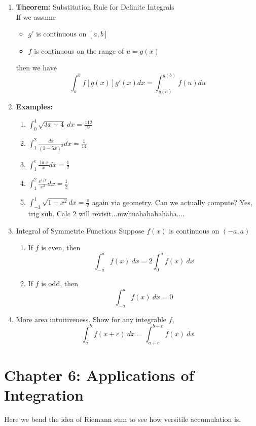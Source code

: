 \documentclass{article}
\newcommand{\ds}{\displaystyle}
\begin{document}
\begin{enumerate}
\item {\bf Theorem:} Substitution Rule for Definite Integrals \\
If we assume
\begin{itemize}
\item $g'$ is continuous on $[a,b]$
\item $f$ is continuous on the range of $u=g(x)$
\end{itemize}
then we have
$$
\int_a^b f[g(x)]g'(x)dx = \int_{g(a)}^{g(b)}f(u)du
$$

\item {\bf Examples:}
\begin{enumerate}
\item $\ds \int_0^4 \sqrt{3x+4}~dx  = \frac{112}{9}$
\item $\ds \int_1^2\frac{dx}{(3-5x)^2}dx = \frac{1}{14}$
\item $\ds \int_1^e \frac{\ln x}{x}dx = \frac{1}{2}$
\item $\ds \int_1^2 \frac{e^{1/x}}{x^2}dx = \frac{1}{2}$
\item $\ds \int_{-1}^1 \sqrt{1-x^2}dx = \frac{\pi}{2}$ again via geometry. Can we actually compute? Yes, trig sub. Calc 2 will revisit...mwhuahahahahaha....
\end{enumerate}

\item Integral of Symmetric Functions
Suppose $f(x)$ is continuous on $(-a,a)$
\begin{enumerate}
\item If $f$ is even, then 
$$
\int_{-a}^a f(x)~dx = 2\int_0^af(x)~dx 
$$
\item If $f$ is odd, then 
$$
\int_{-a}^a f(x)~dx  = 0
$$
\end{enumerate}

\item More area intuitiveness. Show for any integrable $f$,
$$
\int_a^b f(x+c)~dx = \int_{a+c}^{b+c}f(x)~dx
$$
\end{enumerate}

\section{Chapter 6: Applications of Integration}

Here we bend the idea of Riemann sum to see how versitile accumulation is.

\end{document}
